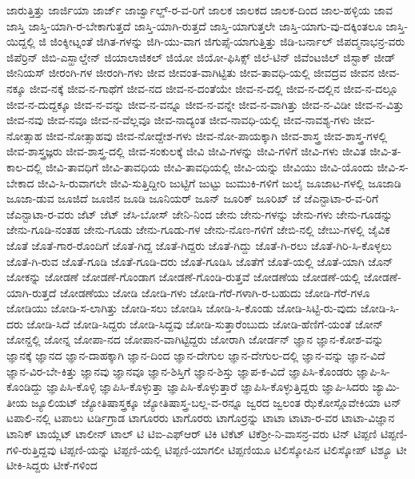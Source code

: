 {ಜಾರುತ್ತಿತ್ತು
ಜಾರ್ಜಿಯಾ
ಜಾರ್ಜ್
ಜಾರ್ಜ್ವಾಲ್ಡ್-ರ-ವ-ರಿಗೆ
ಜಾಲಕ
ಜಾಲಕದ
ಜಾಲಕ-ದಿಂದ
ಜಾಲ-ಹಳ್ಳಿಯ
ಜಾವ
ಜಾಸ್ತಿ
ಜಾಸ್ತಿ-ಯಾಗಿ-ರ-ಬೇಕಾಗುತ್ತದೆ
ಜಾಸ್ತಿ-ಯಾಗಿ-ರುತ್ತದೆ
ಜಾಸ್ತಿ-ಯಾಗುತ್ತಲೇ
ಜಾಸ್ತಿ-ಯಾಗು-ವು-ದಕ್ಕಿಂತಲೂ
ಜಾಸ್ತಿ-ಯಿದ್ದಲ್ಲಿ
ಜಿ
ಜಿಂಕ್ಶೀಟ್ನಂತೆ
ಜಿಗಿತ-ಗಳನ್ನು
ಜಿಗಿ-ಯು-ವಾಗ
ಜಿಗುಪ್ಸೆ-ಯಾಗುತ್ತಿತ್ತು
ಜಿಡಿ-ಬರ್ನಾಲ್
ಜಿಪದ್ಮನಾಭನ್ರ-ವರು
ಜಿಪೆರ್ರಿನ್
ಜಿಬಿ-ಎಸ್ಹಾಲ್ಡೇನ್
ಜಿಯಾಲಾಜಿಕಲ್
ಜಿಯೋ
ಜಿಯೋ-ಫಿಸಿಕ್ಸ್
ಜಿಲೆ-ಟಿನ್
ಜಿವೆಂಟಜಿಲ್
ಜಿಸ್ಟಾಕ್
ಜೀಡ್
ಜೀನಿಯಸ್
ಜೀರಂಗಿ-ಗಳ
ಜೀರಂಗಿ-ಗಳು
ಜೀವ
ಜೀವಂತ-ವಾಗಿಟ್ಟಿತು
ಜೀವ-ತಾವಧಿ-ಯಲ್ಲಿ
ಜೀವದ್ರವ
ಜೀವನ
ಜೀವ-ನಕ್ಕೂ
ಜೀವ-ನಕ್ಕೆ
ಜೀವ-ನ-ಗಾಥೆಗೆ
ಜೀವ-ನದ
ಜೀವ-ನ-ದಂತೆಯೇ
ಜೀವ-ನ-ದಲ್ಲಿ
ಜೀವ-ನ-ದಲ್ಲಿನ
ಜೀವ-ನ-ದಲ್ಲೂ
ಜೀವ-ನ-ದುದ್ದಕ್ಕೂ
ಜೀವ-ನ-ವನ್ನು
ಜೀವ-ನ-ವನ್ನೂ
ಜೀವ-ನ-ವನ್ನೇ
ಜೀವ-ನ-ವಾಗಿತ್ತು
ಜೀವ-ನ-ವಿಡೀ
ಜೀವ-ನ-ವಿತ್ತು
ಜೀವ-ನವು
ಜೀವ-ನವೂ
ಜೀವ-ನ-ವೆಲ್ಲವೂ
ಜೀವ-ನಾದ್ಯಂತ
ಜೀವ-ನಾವಧಿ-ಯಲ್ಲಿ
ಜೀವ-ನಾವಶ್ಯ-ಗಳು
ಜೀವ-ನೋತ್ಸಾಹ
ಜೀವ-ನೋತ್ಸಾಹವು
ಜೀವ-ನೋದ್ದೇಶ-ಗಳು
ಜೀವ-ನೋ-ಪಾಯಕ್ಕಾಗಿ
ಜೀವ-ಶಾಸ್ತ್ರ
ಜೀವ-ಶಾಸ್ತ್ರ-ಗಳಲ್ಲಿ
ಜೀವ-ಶಾಸ್ತ್ರಜ್ಞರು
ಜೀವ-ಶಾಸ್ತ್ರ-ದಲ್ಲಿ
ಜೀವ-ಸಂಕುಲಕ್ಕೆ
ಜೀವಿ
ಜೀವಿ-ಗಳನ್ನು
ಜೀವಿ-ಗಳಿಗೆ
ಜೀವಿ-ಗಳು
ಜೀವಿತ
ಜೀವಿ-ತ-ಕಾಲ-ದಲ್ಲಿ
ಜೀವಿ-ತಾವಧಿಗೆ
ಜೀವಿ-ತಾವಧಿಯ
ಜೀವಿ-ತಾವಧಿಯಲ್ಲಿ
ಜೀವಿ-ಯನ್ನು
ಜೀವಿಯು
ಜೀವಿ-ಯೊಂದು
ಜೀವಿ-ಸ-ಬೇಕಾದ
ಜೀವಿ-ಸಿ-ರುವಾಗಲೇ
ಜೀವಿ-ಸುತ್ತಿದ್ದೀರಿ
ಜುಟ್ಟಿಗೆ
ಜುಟ್ಟು
ಜುಮುಕಿ-ಗಳಿಗೆ
ಜುಲೈ
ಜೂಜಾಟ-ಗಳಲ್ಲಿ
ಜೂಜಾಡಿ
ಜೂಜಾ-ಡುವ
ಜೂಜಿದೆ
ಜೂಜಿನ
ಜೂಡಿ
ಜೂನಿಯರ್
ಜೂನ್
ಜೂರಿಕ್
ಜೂರಿಖ್
ಜೆ
ಜೆಎನ್ಟಾಟಾ-ರ-ವ-ರಿಗೆ
ಜೆಎನ್ಟಾಟಾ-ರ-ವರು
ಜೆಟ್
ಜೆಟ್
ಜೆಸಿ-ಬೋಸ್
ಜೇನಿ-ನಿಂದ
ಜೇನು
ಜೇನು-ಗಳನ್ನು
ಜೇನು-ಗಳು
ಜೇನು-ಗೂಡನ್ನು
ಜೇನು-ಗೂಡಿ-ನಂತಹ
ಜೇನು-ಗೂಡು
ಜೇನು-ಗೂಡು-ಗಳ
ಜೇನು-ನೊಣ-ಗಳಿಗೆ
ಜೇಬಿ-ನಲ್ಲಿ
ಜೇಬು-ಗಳಲ್ಲಿ
ಜೈವಿಕ
ಜೊತೆ
ಜೊತೆ-ಗಾರ-ರೊಂದಿಗೆ
ಜೊತೆ-ಗಿದ್ದ
ಜೊತೆ-ಗಿದ್ದರು
ಜೊತೆ-ಗಿದ್ದು
ಜೊತೆ-ಗಿ-ರಲು
ಜೊತೆ-ಗಿರಿ-ಸಿ-ಕೊಳ್ಳಲು
ಜೊತೆ-ಗಿ-ರುವ
ಜೊತೆ-ಗೂಡಿ
ಜೊತೆ-ಗೂಡಿ-ದರು
ಜೊತೆ-ಗೂಡಿಸಿ
ಜೊತೆಗೆ
ಜೊತೆ-ಯಲ್ಲಿ
ಜೊತೆ-ಯಾಗಿ
ಜೊನ್
ಜೋಕನ್ನು
ಜೋಡಣೆ
ಜೋಡಣೆ-ಗೊಂಡಾಗ
ಜೋಡಣೆ-ಗೊಂಡಿ-ರುತ್ತವೆ
ಜೋಡಣೆಯ
ಜೋಡಣೆ-ಯಲ್ಲಿ
ಜೋಡಣೆ-ಯಾಗಿ-ರುತ್ತದೆ
ಜೋಡಣೆಯು
ಜೋಡಿ
ಜೋಡಿ-ಗಳು
ಜೋಡಿ-ಗೆರೆ-ಗಳಾಗಿ-ರ-ಬಹುದು
ಜೋಡಿ-ಗೆರೆ-ಗಳೂ
ಜೋಡಿಯು
ಜೋಡಿ-ಸ-ಲಾಗಿತ್ತು
ಜೋಡಿ-ಸಲು
ಜೋಡಿಸಿ
ಜೋಡಿ-ಸಿ-ಕೊಂಡು
ಜೋಡಿ-ಸಿಟ್ಟಿ-ರು-ವುದು
ಜೋಡಿ-ಸಿ-ದರು
ಜೋಡಿ-ಸಿದೆ
ಜೋಡಿ-ಸಿದ್ದರು
ಜೋಡಿ-ಸಿದ್ದವು
ಜೋಡಿ-ಸುತ್ತಾರೆಂಬುದು
ಜೋಡಿ-ಹೆಣಿಗೆ-ಯಂತೆ
ಜೋನ್
ಜೋನ್ದಲ್ಲಿ
ಜೋನ್ನ
ಜೋಪಾ-ನದ
ಜೋಪಾನ-ವಾಗಿಟ್ಟಿದ್ದರು
ಜೋರಾಗಿ
ಜೋರ್ಡನ್
ಜ್ಞಾನ
ಜ್ಞಾನ-ಕೋಶ-ವನ್ನು
ಜ್ಞಾನಕ್ಕೆ
ಜ್ಞಾನದ
ಜ್ಞಾನ-ದಾಹಕ್ಕಾಗಿ
ಜ್ಞಾನ-ದಿಂದ
ಜ್ಞಾನ-ದೇಗುಲ
ಜ್ಞಾನ-ದೇಗುಲ-ದಲ್ಲಿ
ಜ್ಞಾನ-ವನ್ನು
ಜ್ಞಾನ-ವಿದೆ
ಜ್ಞಾನ-ವಿರ-ಬೇ-ಕಿತ್ತು
ಜ್ಞಾನವು
ಜ್ಞಾನವೂ
ಜ್ಞಾನ-ಶಿಸ್ತಿಗೆ
ಜ್ಞಾನ-ಶಿಸ್ತು
ಜ್ಞಾಪ-ಕ-ವಿದೆ
ಜ್ಞಾಪಿಸಿ-ಕೊಂಡರು
ಜ್ಞಾಪಿ-ಸಿ-ಕೊಂಡಿದ್ದು
ಜ್ಞಾಪಿಸಿ-ಕೊಳ್ಳಿ
ಜ್ಞಾಪಿಸಿ-ಕೊಳ್ಳುತ್ತಾ
ಜ್ಞಾಪಿಸಿ-ಕೊಳ್ಳುತ್ತಾರೆ
ಜ್ಞಾಪಿಸಿ-ಕೊಳ್ಳುತ್ತಿದ್ದರು
ಜ್ಞಾಪಿ-ಸಿದರು
ಜ್ಯಾಮಿ-ತೀಯ
ಜ್ಯೂಲಿಯಟ್
ಜ್ಯೋತಿಷಾಸ್ತ್ರಕ್ಕೂ
ಜ್ಯೋತಿಷಾಸ್ತ್ರ-ಬಲ್ಲ-ವ-ರನ್ನೂ
ಜ್ವರದ
ಜ್ವಲಂತ
ಝೆಕೋಸ್ಲೊವೇಕಿಯಾ
ಟನ್
ಟಪಾಲಿ-ನಲ್ಲಿ
ಟಪಾಲು
ಟರ್ಡಿಗ್ರಾಡ
ಟಾಗೂರರು
ಟಾಗೊರರು
ಟಾಗೊರ್ರನ್ನು
ಟಾಟಾ
ಟಾಟಾ-ರ-ವರ
ಟಾಟಾ-ವಿಜ್ಞಾನ
ಟಾನಿಕ್
ಟಾಯ್ಲೆಟ್
ಟಾಲೀನ್
ಟಾಲ್
ಟಿ
ಟಿಐ-ಎಫ್ಆರ್
ಟಿಕಿ
ಟಿಕೆಟ್
ಟಿಕೆಶ್ರೀ-ನಿ-ವಾಸನ್ರ-ವರು
ಟಿನ್
ಟಿಪ್ಪಣಿ
ಟಿಪ್ಪಣಿ-ಗಳಿ-ರುತ್ತಿದ್ದವು
ಟಿಪ್ಪಣಿ-ಯನ್ನು
ಟಿಪ್ಪಣಿ-ಯಲ್ಲಿ
ಟಿಪ್ಪಣಿ-ಯಾಗಲೀ
ಟಿಪ್ಪಣಿಯೂ
ಟಿಲಿಸ್ಕೋಪಿನ
ಟಿಲಿಸ್ಕೋಪ್
ಟಿಶ್ಯೂ
ಟೀ
ಟೀಕಿ-ಸಿದ್ದರು
ಟೀಕೆ-ಗಳಿಂದ
}
